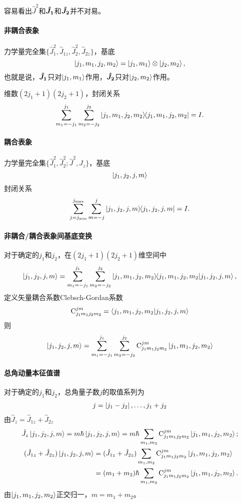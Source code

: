 容易看出$\hat J^2$和$\qo{J_1}$和$\qo{J_2}$并不对易。
\paragraph*{非耦合表象}力学量完全集$\{\hat J_1^2,\hat J_{1z},\hat J_2^2,\hat J_{2z}\}$，基底
\[\ket{j_1,m_1,j_2,m_2}=\ket{j_1,m_1}\otimes\ket{j_2,m_2},\]
也就是说，$\qo{J_1}$只对$\ket{j_1,m_1}$作用，$\qo{J_2}$只对$\ket{j_2,m_2}$作用。

维数$(2j_1+1)(2j_2+1)$，封闭关系
\begin{align*}
	\sum_{m_1=-j_1}^{j_1}\sum_{m_2=-j_2}^{j_2}\ktbr{j_1,m_1,j_2,m_2}{j_1,m_1,j_2,m_2}=I.
\end{align*}
\paragraph*{耦合表象}力学量完全集$\{\hat J_1^2,\hat J_2^2;\hat J^2,\hat J_z\}$，基底
\[\ket{j_1,j_2,j,m}\]
封闭关系
\[\sum_{j=j_{\min}}^{j_{\max}}\sum_{m=-j}^j\ktbr{j_1,j_2,j,m}{j_1,j_2,j,m}=I.\]
\paragraph*{非耦合/耦合表象间基底变换}对于确定的$j_1$和$j_2$，在$(2j_1+1)(2j_2+1)$维空间中
\begin{align*}
	\ket{j_1,j_2,j,m}=\sum_{m_1=-j_1}^{j_1}\sum_{m_2=-j_2}^{j_2}\ket{j_1,m_1,j_2,m_2}\bs3\brkt{j_1,m_1,j_2,m_2}{j_1,j_2,j,m},
\end{align*}
定义矢量耦合系数Clebsch-Gordan系数
\[\Cle_{j_1m_1j_2m_2}^{jm}=\brkt{j_1,m_1,j_2,m_2}{j_1,j_2,j,m}\]
则
\begin{align}
	\ket{j_1,j_2,j,m}=\sum_{m_1=-j_1}^{j_1}\sum_{m_2=-j_2}^{j_2}\Cle_{j_1m_1j_2m_2}^{jm}\ket{j_1,m_1,j_2,m_2}
\end{align}
\paragraph*{总角动量本征值谱}对于确定的$j_1$和$j_2$，总角量子数$j$的取值系列为
\begin{align}
	j=\abs{j_1-j_2},\ldots,j_1+j_2
\end{align}
由$\hat J_z=\hat J_{1z}+\hat J_{2z}$
\begin{align*}
	\hat J_z\ket{j_1,j_2,j,m}=m\hbar\ket{j_1,j_2,j,m}=m\hbar\sum_{m_1,m_2}\Cle_{j_1m_1j_2m_2}^{jm}\ket{j_1,m_1,j_2,m_2};\\
	\begin{aligned}
		(\hat J_{1z}+\hat J_{2z})\ket{j_1,j_2,j,m}&=(\hat J_{1z}+\hat J_{2z})\sum_{m_1,m_2}\Cle_{j_1m_1j_2m_2}^{jm}\ket{j_1,m_1,j_2,m_2}\\
		&=(m_1+m_2)\hbar\sum_{m_1,m_2}\Cle_{j_1m_1j_2m_2}^{jm}\ket{j_1,m_1,j_2,m_2}.
	\end{aligned}
\end{align*}
由$\ket{j_1,m_1,j_2,m_2}$正交归一，$m=m_1+m_2$。%

